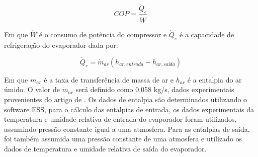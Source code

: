 \begin{equation}
    COP = \frac{\dot Q_e}{\dot W}
    \label{eq:COP}
\end{equation}

Em que $\dot W$ é o consumo de potência do compressor e $ \dot Q_e$ é a capacidade de refrigeração do evaporador dada por:

\begin{equation}
    \dot Q_e = \dot m_{ar}(h_{ar,entrada} - h_{ar,saída})
\end{equation}

Em que $\dot m_{ar}$ é a taxa de transferência de massa de ar e $h_{ar}$ é a entalpia do ar úmido. O valor de $\dot m_{ar}$ será definido como 0,058 kg/s, dados experimentais provenientes do artigo de \textcite{ExperimentalThermalPerformance}. Os dados de entalpia são determinados utilizando o software ESS, para o cálculo das entalpias de entrada, os dados experimentais da temperatura e umidade relativa de entrada do evaporador foram utilizados, assumindo pressão constante igual a uma atmosfera. Para as entalpias de saída, foi também assumida uma pressão constante de uma atmosfera e utilizado os dados de temperatura e umidade relativa de saída do evaporador. 